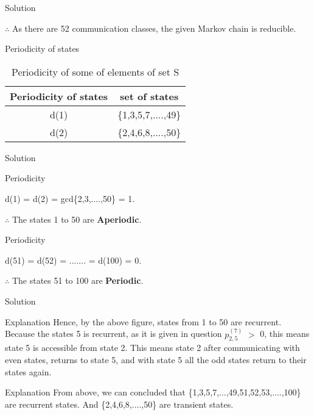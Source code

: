 \documentclass{beamer}
\begin{document}
\begin{frame}{Solution}
\begin{block}
$\therefore$ As there are 52 communication classes, the given Markov chain is reducible. 
\end{block}
\begin{block}{Periodicity of states}
\begin{table}[h!]
\resizebox{\columnwidth}{!}
{ 
\begin{tabular}{|c|c|}
\hline
Periodicity of states & set of states  \\  \hline
d(1) & \{1,3,5,7,....,49\}  \\  \hline
d(2) & \{2,4,6,8,....,50\}  \\  \hline
\end{tabular}
}
\caption{Periodicity of some of elements of set S} 
\label{table} 
\end{table}
\end{block}
\end{frame}
\begin{frame}{Solution}
\begin{block}{Periodicity}
\begin{center}
    d(1) = d(2) = gcd\{2,3,....,50\} = 1.  \\
\end{center}
$\therefore$ The states 1 to 50 are \textbf{Aperiodic}.
\end{block}
\begin{block}{Periodicity}
\begin{center}
    d(51) = d(52) = ....... = d(100) = 0.  \\
\end{center}
$\therefore$ The states 51 to 100 are \textbf{Periodic}.
\end{block}
\end{frame}
\begin{frame}{Solution}
\begin{block}{Explanation}
Hence, by the above figure, states from 1 to 50 are recurrent. Because the states 5 is recurrent, as it is given in question $p^{(7)}_{2,5}$ $>$ 0, this means state 5 is accessible from state 2. This means state 2 after communicating with even states, returns to state 5, and with state 5 all the odd states return to their states again. 
\end{block}
\begin{block}{Explanation}
From above, we can concluded that \{1,3,5,7,...,49,51,52,53,....,100\} are recurrent states. And \{2,4,6,8,....,50\} are transient states.
\end{block}
\end{frame}
\end{document}
